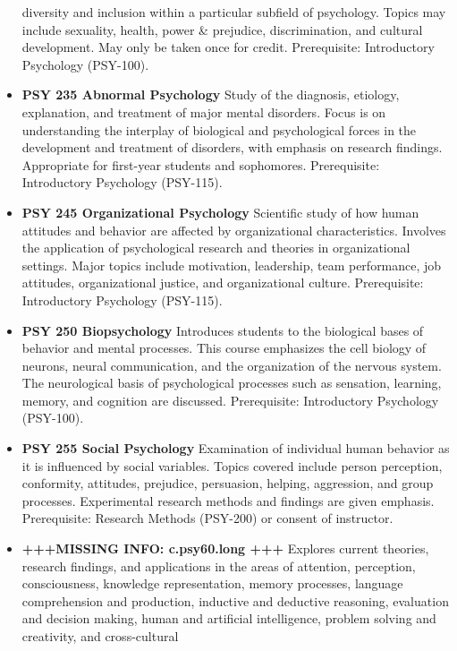 \documentclass[
  letterpaper,
]{scrbook}
\begin{document}
\begin{itemize}
  diversity and inclusion within a particular subfield of psychology.
  Topics may include sexuality, health, power \& prejudice,
  discrimination, and cultural development. May only be taken once for
  credit. Prerequisite: Introductory Psychology (PSY-100).
\item
  \textbf{PSY 235 Abnormal Psychology} Study of the diagnosis, etiology,
  explanation, and treatment of major mental disorders. Focus is on
  understanding the interplay of biological and psychological forces in
  the development and treatment of disorders, with emphasis on research
  findings. Appropriate for first-year students and sophomores.
  Prerequisite: Introductory Psychology (PSY-115).\\
\item
  \textbf{PSY 245 Organizational Psychology} Scientific study of how
  human attitudes and behavior are affected by organizational
  characteristics. Involves the application of psychological research
  and theories in organizational settings. Major topics include
  motivation, leadership, team performance, job attitudes,
  organizational justice, and organizational culture. Prerequisite:
  Introductory Psychology (PSY-115).
\item
  \textbf{PSY 250 Biopsychology} Introduces students to the biological
  bases of behavior and mental processes. This course emphasizes the
  cell biology of neurons, neural communication, and the organization of
  the nervous system. The neurological basis of psychological processes
  such as sensation, learning, memory, and cognition are discussed.
  Prerequisite: Introductory Psychology (PSY-100).\\
\item
  \textbf{PSY 255 Social Psychology} Examination of individual human
  behavior as it is influenced by social variables. Topics covered
  include person perception, conformity, attitudes, prejudice,
  persuasion, helping, aggression, and group processes. Experimental
  research methods and findings are given emphasis. Prerequisite:
  Research Methods (PSY-200) or consent of instructor.
\item
  \textbf{+++MISSING INFO: c.psy60.long +++} Explores current theories,
  research findings, and applications in the areas of attention,
  perception, consciousness, knowledge representation, memory processes,
  language comprehension and production, inductive and deductive
  reasoning, evaluation and decision making, human and artificial
  intelligence, problem solving and creativity, and cross-cultural

\end{itemize}
\end{document}
